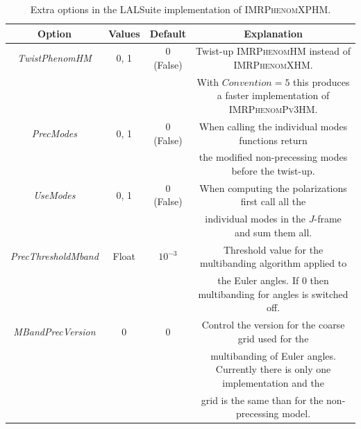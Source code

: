 \documentclass[%
aps,
prd,
amssymb,
amsmath,
amsfonts,
eqsecnum,
showpacs,
nofootinbib,
floatfix,
twocolumn,
twoside,
a4paper,
superscriptaddress
]{revtex4-1}
\newcommand{\phHM}{\textsc{IMRPhenomHM}\xspace}
\newcommand{\phPvthreehm}{\textsc{IMRPhenomPv3HM}\xspace}
\newcommand{\phXHM}{\textsc{IMRPhenomXHM}\xspace}
\newcommand{\phXPHM}{\textsc{IMRPhenomXPHM}\xspace}
\begin{document}
\begin{table}[hptb]
\vspace{2\baselineskip}

\centering
    \begin{tabular}{ |c | c | c| c| }
\hline
Option & Values & Default & Explanation \\ \hline\hline
\textit{TwistPhenomHM} & 0, 1 &  0 (False) &  Twist-up \phHM instead of \phXHM.\\ & & & With $Convention=5$ this  produces a faster implementation of \phPvthreehm. 
\\ \hline
\textit{PrecModes} & 0, 1 & 0 (False) & When calling the individual modes functions return \\ & & & the modified non-precessing modes before the twist-up.
\\ \hline
\textit{UseModes} & 0, 1 & 0 (False) & When computing the polarizations first call all the \\ & & & individual modes in the $J$-frame and sum them all.
\\ \hline
\textit{PrecThresholdMband} & Float & $10^{-3}$  & Threshold value for the multibanding algorithm applied to \\ & & & the Euler angles. If 0 then multibanding for angles is switched off. 
\\ \hline
\textit{MBandPrecVersion} & 0 & 0 & Control the version for the coarse grid used for the \\& & & multibanding of Euler angles. Currently there is only one implementation and the \\ & & & grid is the same than for the non-precessing model. 
\\ \hline
\end{tabular}
    \caption{Extra options in the LALSuite implementation of \phXPHM. }
    \label{tab:extra_options}

\vspace{2\baselineskip}


\end{table}
\end{document}
